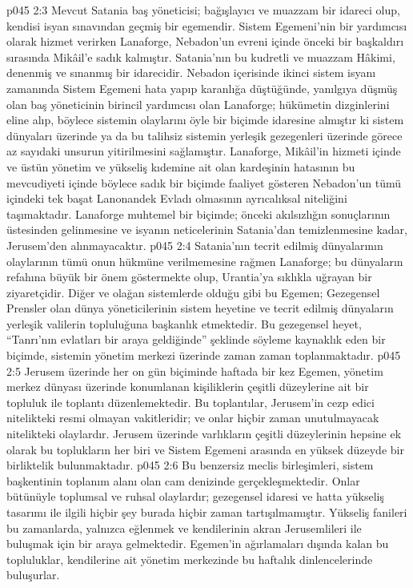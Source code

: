 \vs p045 2:3 Mevcut Satania baş yöneticisi; bağışlayıcı ve muazzam bir idareci olup, kendisi isyan sınavından geçmiş bir egemendir. Sistem Egemeni’nin bir yardımcısı olarak hizmet verirken Lanaforge, Nebadon’un evreni içinde önceki bir başkaldırı sırasında Mikâil’e sadık kalmıştır. Satania’nın bu kudretli ve muazzam Hâkimi, denenmiş ve sınanmış bir idarecidir. Nebadon içerisinde ikinci sistem isyanı zamanında Sistem Egemeni hata yapıp karanlığa düştüğünde, yanılgıya düşmüş olan baş yöneticinin birincil yardımcısı olan Lanaforge; hükümetin dizginlerini eline alıp, böylece sistemin olaylarını öyle bir biçimde idaresine almıştır ki sistem dünyaları üzerinde ya da bu talihsiz sistemin yerleşik gezegenleri üzerinde görece az sayıdaki unsurun yitirilmesini sağlamıştır. Lanaforge, Mikâil’in hizmeti içinde ve üstün yönetim ve yükseliş kıdemine ait olan kardeşinin hatasının bu mevcudiyeti içinde böylece sadık bir biçimde faaliyet gösteren Nebadon’un tümü içindeki tek başat Lanonandek Evladı olmasının ayrıcalıksal niteliğini taşımaktadır. Lanaforge muhtemel bir biçimde; önceki akılsızlığın sonuçlarının üstesinden gelinmesine ve isyanın neticelerinin Satania’dan temizlenmesine kadar, Jerusem’den alınmayacaktır.
\vs p045 2:4 Satania’nın tecrit edilmiş dünyalarının olaylarının tümü onun hükmüne verilmemesine rağmen Lanaforge; bu dünyaların refahına büyük bir önem göstermekte olup, Urantia’ya sıklıkla uğrayan bir ziyaretçidir. Diğer ve olağan sistemlerde olduğu gibi bu Egemen; Gezegensel Prensler olan dünya yöneticilerinin sistem heyetine ve tecrit edilmiş dünyaların yerleşik valilerin topluluğuna başkanlık etmektedir. Bu gezegensel heyet, “Tanrı’nın evlatları bir araya geldiğinde” şeklinde söyleme kaynaklık eden bir biçimde, sistemin yönetim merkezi üzerinde zaman zaman toplanmaktadır.
\vs p045 2:5 Jerusem üzerinde her on gün biçiminde haftada bir kez Egemen, yönetim merkez dünyası üzerinde konumlanan kişiliklerin çeşitli düzeylerine ait bir topluluk ile toplantı düzenlemektedir. Bu toplantılar, Jerusem’in cezp edici nitelikteki resmi olmayan vakitleridir; ve onlar hiçbir zaman unutulmayacak nitelikteki olaylardır. Jerusem üzerinde varlıkların çeşitli düzeylerinin hepsine ek olarak bu toplukların her biri ve Sistem Egemeni arasında en yüksek düzeyde bir birliktelik bulunmaktadır.
\vs p045 2:6 Bu benzersiz meclis birleşimleri, sistem başkentinin toplanım alanı olan cam denizinde gerçekleşmektedir. Onlar bütünüyle toplumsal ve ruhsal olaylardır; gezegensel idaresi ve hatta yükseliş tasarımı ile ilgili hiçbir şey burada hiçbir zaman tartışılmamıştır. Yükseliş fanileri bu zamanlarda, yalnızca eğlenmek ve kendilerinin akran Jerusemlileri ile buluşmak için bir araya gelmektedir. Egemen’in ağırlamaları dışında kalan bu topluluklar, kendilerine ait yönetim merkezinde bu haftalık dinlencelerinde buluşurlar.
